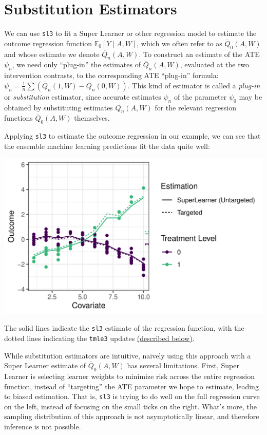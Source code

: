 \documentclass[
  12pt, krantz2,
]{krantz}
\newcommand{\passthrough}[1]{#1}
\newcommand{\1}{\mathbbm{1}}
\theoremstyle{definition}
\theoremstyle{definition}
\theoremstyle{definition}
\theoremstyle{definition}
\theoremstyle{remark}
\begin{document}
\hypertarget{substitution-est}{%
\section{Substitution Estimators}\label{substitution-est}}

We can use \passthrough{\lstinline!sl3!} to fit a Super Learner or other regression model to estimate
the outcome regression function \(\mathbb{E}_0[Y \mid A,W]\), which we often refer
to as \(\overline{Q}_0(A,W)\) and whose estimate we denote \(\overline{Q}_n(A,W)\).
To construct an estimate of the ATE \(\psi_n\), we need only ``plug-in'' the
estimates of \(\overline{Q}_n(A,W)\), evaluated at the two intervention contrasts,
to the corresponding ATE ``plug-in'' formula:
\(\psi_n = \frac{1}{n}\sum(\overline{Q}_n(1,W)-\overline{Q}_n(0,W))\). This kind
of estimator is called a \emph{plug-in} or \emph{substitution} estimator, since accurate
estimates \(\psi_n\) of the parameter \(\psi_0\) may be obtained by substituting
estimates \(\overline{Q}_n(A,W)\) for the relevant regression functions
\(\overline{Q}_0(A,W)\) themselves.

Applying \passthrough{\lstinline!sl3!} to estimate the outcome regression in our example, we can see
that the ensemble machine learning predictions fit the data quite well:

\begin{center}\includegraphics[width=0.8\linewidth]{img/png/schematic_2b_sllik} \end{center}

The solid lines indicate the \passthrough{\lstinline!sl3!} estimate of the regression function, with the
dotted lines indicating the \passthrough{\lstinline!tmle3!} updates \protect\hyperlink{tmle-updates}{(described below)}.

While substitution estimators are intuitive, naively using this approach with a
Super Learner estimate of \(\overline{Q}_0(A,W)\) has several limitations. First,
Super Learner is selecting learner weights to minimize risk across the entire
regression function, instead of ``targeting'' the ATE parameter we hope to
estimate, leading to biased estimation. That is, \passthrough{\lstinline!sl3!} is trying to do well on
the full regression curve on the left, instead of focusing on the small ticks on
the right. What's more, the sampling distribution of this approach is not
asymptotically linear, and therefore inference is not possible.
\end{document}
